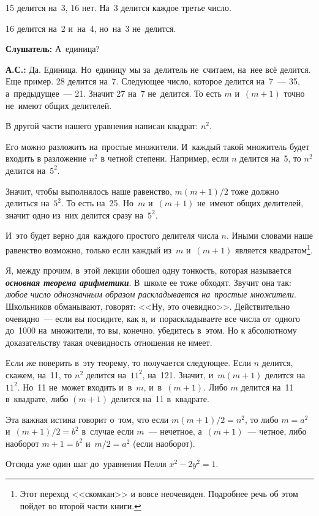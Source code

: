 15 делится на~3, 16 нет. На~3 делится каждое третье число.

16 делится на~2 и~на~4, но~на~3 не~делится.

\textbf{Слушатель:} А~единица?

\textbf{А.С.:} Да. Единица. Но~единицу мы за~делитель не~считаем, на~нее всё делится. Еще пример.
28 делится на~7. Следующее число, которое делится на~7~--- 35, а~предыдущее~--- 21. Значит 27 на~7
не~делится. То есть $m$ и~$(m+1)$ точно не~имеют общих делителей.

В другой части нашего уравнения написан квадрат: $n^{2}$.

Его можно разложить на~простые множители. И~каждый такой множитель будет входить в разложение $n^{2}$ в четной степени. Например, если $n$ делится
на~5, то $n^{2}$ делится на~$5^{2}$.

Значит, чтобы выполнялось наше равенство, $m(m+1)/2$ тоже должно делиться на~$5^{2}$. То есть на~25. Но~$m$
и~$(m+1)$ не~имеют общих делителей, значит одно из~них делится сразу на~$5^{2}$.

И~это будет верно для~каждого простого делителя числа $n$. Иными словами наше равенство возможно,
только если каждый из~$m$ и~$(m+1)$ является квадратом\footnote{Этот переход <<скомкан>> и вовсе
неочевиден. Подробнее речь об этом пойдет во второй части книги.}.

Я, между прочим, в~этой лекции обошел одну тонкость, которая называется \textbf{\textit{основная теорема
арифметики}}. В~школе ее тоже обходят. Звучит она так: \textit{любое число однозначным образом раскладывается
на~простые множители}. Школьников обманывают, говорят: <<Ну, это очевидно>>. Действительно очевидно~--- если вы
посидите, как я, и~пораскладываете все числа от~одного до~1000 на~множители, то вы, конечно,
убедитесь в~этом. Но к абсолютному доказательству такая очевидность отношения не имеет.


Если же поверить в~эту теорему, то получается следующее. Если $n$ делится, скажем, на~11, то $n^{2}$
делится на~$11^{2}$, на~121. Значит, и~$m(m+1)$ делится на~$11^{2}$. Но~11 не~может входить и~в~$m$, и~в~$(m+1)$.
Либо $m$ делится на~11 в~квадрате, либо $(m+1)$ делится на~11 в~квадрате.

Эта важная истина говорит о~том, что если $m(m+1)/2=n^{2}$, то либо $m=a^{2}$ и~$(m+1)/2=b^{2}$ в~случае если
$m$~--- нечетное, а~$(m+1)$~--- четное, либо наоборот $m+1=b^{2}$ и~$m/2=a^{2}$ (если наоборот).


Отсюда уже один шаг до~уравнения Пелля $x^{2}-2y^{2}=1$.

